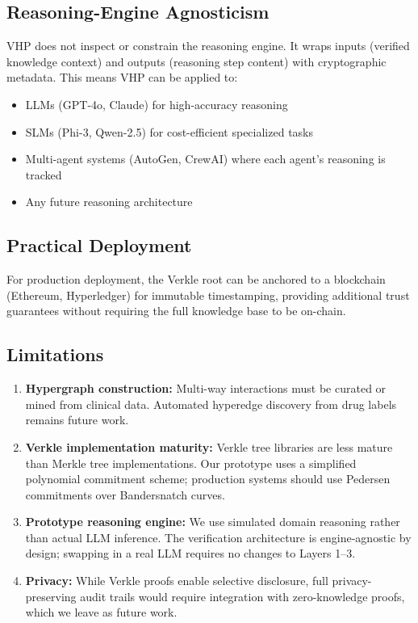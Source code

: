 \documentclass[11pt,a4paper]{article}
\begin{document}
\subsection{Reasoning-Engine Agnosticism}

VHP does not inspect or constrain the reasoning engine. It wraps inputs (verified knowledge context) and outputs (reasoning step content) with cryptographic metadata. This means VHP can be applied to:
\begin{itemize}[noitemsep]
    \item LLMs (GPT-4o, Claude) for high-accuracy reasoning
    \item SLMs (Phi-3, Qwen-2.5) for cost-efficient specialized tasks
    \item Multi-agent systems (AutoGen, CrewAI) where each agent's reasoning is tracked
    \item Any future reasoning architecture
\end{itemize}

\subsection{Practical Deployment}

For production deployment, the Verkle root can be anchored to a blockchain (Ethereum, Hyperledger) for immutable timestamping, providing additional trust guarantees without requiring the full knowledge base to be on-chain.

\subsection{Limitations}

\begin{enumerate}[noitemsep]
    \item \textbf{Hypergraph construction:} Multi-way interactions must be curated or mined from clinical data. Automated hyperedge discovery from drug labels remains future work.
    \item \textbf{Verkle implementation maturity:} Verkle tree libraries are less mature than Merkle tree implementations. Our prototype uses a simplified polynomial commitment scheme; production systems should use Pedersen commitments over Bandersnatch curves.
    \item \textbf{Prototype reasoning engine:} We use simulated domain reasoning rather than actual LLM inference. The verification architecture is engine-agnostic by design; swapping in a real LLM requires no changes to Layers 1--3.
    \item \textbf{Privacy:} While Verkle proofs enable selective disclosure, full privacy-preserving audit trails would require integration with zero-knowledge proofs, which we leave as future work.
\end{enumerate}
\end{document}
